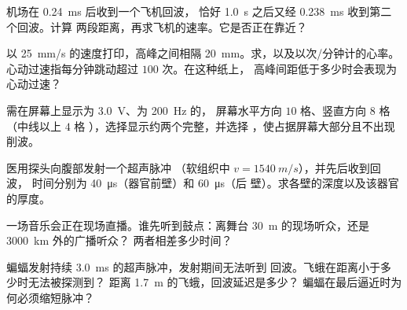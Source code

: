 \begin{exercise}[$\star\star$]\label{exo:g10:signals-and-waves:7}
机场在 \qty{0.24}{ms} 后收到一个飞机回波，
恰好 \qty{1.0}{s} 之后又经 \qty{0.238}{ms} 收到第二个回波。计算
两段距离，再求飞机的速率。它是否正在靠近？
\end{exercise}

\begin{exercise}[$\star\star$]\label{exo:g10:signals-and-waves:8}
以 \qty{25}{mm/s} 的速度打印，高峰之间相隔
\qty{20}{mm}。求，以及以次/分钟计的心率。
心动过速指每分钟跳动超过 $100$ 次。在这种纸上，
高峰间距低于多少时会表现为心动过速？
\end{exercise}

\begin{exercise}[$\star\star$]\label{exo:g10:signals-and-waves:9}
需在屏幕上显示为 \qty{3.0}{V}、为 \qty{200}{Hz} 的，
屏幕水平方向 $10$ 格、竖直方向 $8$ 格（中线以上 $4$ 格
），选择显示约两个完整，并选择
，使占据屏幕大部分且不出现削波。
\end{exercise}

\begin{exercise}[$\star\star$]\label{exo:g10:signals-and-waves:10}
医用探头向腹部发射一个超声脉冲
（软组织中 $v = \qty{1540}{m/s}$），并先后收到回波，
时间分别为 \qty{40}{\micro s}（器官前壁）和 \qty{60}{\micro s}（后
壁）。求各壁的深度以及该器官的厚度。
\end{exercise}

\begin{exercise}[$\star\star$]\label{exo:g10:signals-and-waves:11}
一场音乐会正在现场直播。谁先听到鼓点：离舞台
\qty{30}{m} 的现场听众，还是 \qty{3000}{km} 外的广播听众？
两者相差多少时间？
\end{exercise}

\begin{exercise}[$\star\star\star$]\label{exo:g10:signals-and-waves:12}
蝙蝠发射持续 \qty{3.0}{ms} 的超声脉冲，发射期间无法听到
回波。飞蛾在距离小于多少时无法被探测到？
距离 \qty{1.7}{m} 的飞蛾，回波延迟是多少？
蝙蝠在最后逼近时为何必须缩短脉冲？
\end{exercise}


